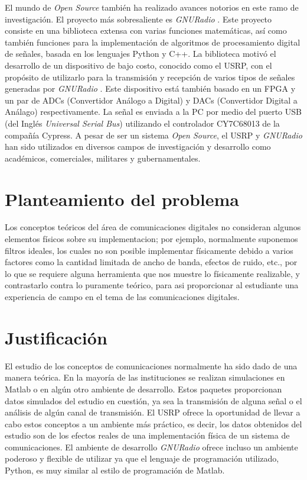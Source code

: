 El mundo de \emph{Open Source} tambi\'en ha realizado avances notorios en este ramo de investigaci\'on. El proyecto m\'as
sobresaliente es \emph{GNURadio} \cite{radio}. Este proyecto consiste en una biblioteca extensa con varias funciones
matem\'aticas, as\'i como tambi\'en funciones para la implementaci\'on de algoritmos de procesamiento digital de se\~nales,
basada en los lenguajes Python y C++. La biblioteca motiv\'o el desarrollo de un dispositivo de bajo costo, conocido
como el USRP, con el prop\'osito de utilizarlo para la transmisi\'on y recepci\'on de varios tipos de se\~nales generadas
por \emph{GNURadio} \cite{ettus}. Este dispositivo est\'a tambi\'en basado en un FPGA y un par de ADCs (Convertidor
An\'alogo a Digital) y DACs (Convertidor Digital a An\'alago) respectivamente. La se\~nal es enviada a la PC por medio del puerto USB
(del Ingl\'es \emph{Universal Serial Bus}) utilizando el controlador CY7C68013 de la compa\~n\'ia Cypress. A pesar de ser un
sistema \emph{Open Source}, el USRP y \emph{GNURadio} han sido utilizados en diversos campos de investigaci\'on y desarrollo como
acad\'emicos, comerciales, militares y gubernamentales.

\section{Planteamiento del problema}
Los conceptos te\'oricos del \'area de comunicaciones digitales no consideran algunos elementos f\'isicos sobre su
implementacion; por ejemplo, normalmente suponemos filtros ideales, los cuales no son posible implementar f\'isicamente
debido a varios factores como la cantidad limitada de ancho de banda, efectos de ruido, etc., por lo que se requiere alguna
herramienta que nos muestre lo f\'isicamente realizable, y contrastarlo contra lo puramente te\'orico, para asi proporcionar
al estudiante una experiencia de campo en el tema de las comunicaciones digitales.

\section{Justificaci\'on}

El estudio de los conceptos de comunicaciones normalmente ha sido dado de una manera te\'orica. En la mayor\'ia de las
instituciones se realizan simulaciones en Matlab o en alg\'un otro ambiente de desarrollo. Estos paquetes proporcionan datos
simulados del estudio en cuesti\'on, ya sea la transmisi\'on de alguna se\~nal o el an\'alisis de alg\'un canal de transmisi\'on.
El USRP ofrece la oportunidad de llevar a cabo estos conceptos a un ambiente m\'as pr\'actico, es decir, los datos obtenidos del
estudio son de los efectos reales de una implementaci\'on f\'isica de un sistema de comunicaciones. El ambiente de desarrollo
\emph{GNURadio} ofrece incluso un ambiente poderoso y flexible de utilizar ya que el lenguaje de programaci\'on utilizado,
Python, es muy similar al estilo de programaci\'on de Matlab.

